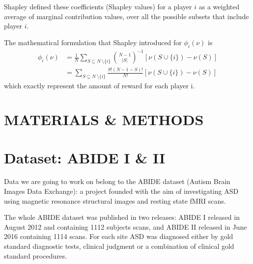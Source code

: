 \documentclass[11pt]{report}
\begin{document}
Shapley defined these coefficients (Shapley values) for a player $i$ as a weighted average of marginal contribution values, over all the possible subsets that include player $i$.

The mathematical formulation that Shapley introduced for $\phi_i(\nu)$ is
\begin{equation}
\begin{aligned}
\phi_i(\nu)  & = \frac{1}{N }\sum_{S\subseteq N\ \setminus \{ i \} }  {\binom{N- 1}{|S|}}^{-1} [\nu (S \cup \{ i \}) - \nu(S)] \\
& = \sum_{S\subseteq N\ \setminus \{ i \} }  \frac{S! (N-1-S)!}{N!} [\nu (S \cup \{ i \}) - \nu(S) ]
\end{aligned}
\end{equation}
which exactly represent the amount of reward for each player i.



\chapter*{MATERIALS \& METHODS}

\chapter{Dataset: ABIDE I \& II}\label{chap:dataset}


Data we are going to work on belong to the ABIDE dataset (Autism Brain Images Data Exchange): a project founded with the aim of investigating ASD using magnetic resonance structural images and resting state fMRI scans.

The whole ABIDE dataset was published in two releases: ABIDE I released in August 2012 and containing 1112 subjects scans, and ABIDE II released in June 2016 containing 1114 scans.
For each site ASD was diagnosed either by gold standard diagnostic tests, clinical judgment or a combination of clinical gold standard procedures.
\end{document}
